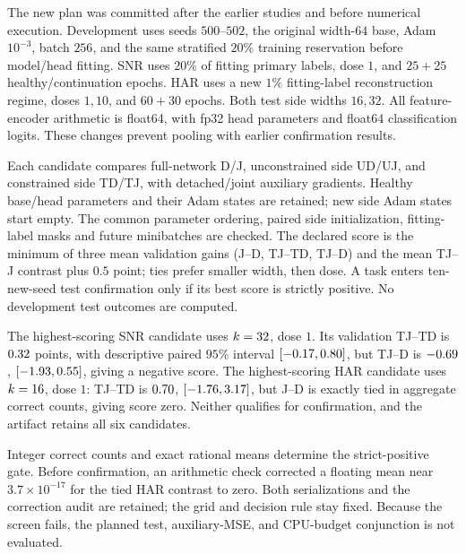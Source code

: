 \documentclass{article}
\begin{document}
The new plan was committed after the earlier studies and before numerical execution. Development uses seeds $500$--$502$, the original width-$64$ base, Adam $10^{-3}$, batch $256$, and the same stratified $20\%$ training reservation before model/head fitting. SNR uses $20\%$ of fitting primary labels, dose $1$, and $25+25$ healthy/continuation epochs. HAR uses a new $1\%$ fitting-label reconstruction regime, doses $1,10$, and $60+30$ epochs. Both test side widths $16,32$. All feature-encoder arithmetic is float64, with fp32 head parameters and float64 classification logits. These changes prevent pooling with earlier confirmation results.

Each candidate compares full-network D/J, unconstrained side UD/UJ, and constrained side TD/TJ, with detached/joint auxiliary gradients. Healthy base/head parameters and their Adam states are retained; new side Adam states start empty. The common parameter ordering, paired side initialization, fitting-label masks and future minibatches are checked. The declared score is the minimum of three mean validation gains (J--D, TJ--TD, TJ--D) and the mean TJ--J contrast plus $0.5$ point; ties prefer smaller width, then dose. A task enters ten-new-seed test confirmation only if its best score is strictly positive. No development test outcomes are computed.



The highest-scoring SNR candidate uses $k=32$, dose $1$. Its validation TJ--TD is $0.32$ points, with descriptive paired $95\%$ interval $[-0.17,0.80]$, but TJ--D is $-0.69$, $[-1.93,0.55]$, giving a negative score. The highest-scoring HAR candidate uses $k=16$, dose $1$: TJ--TD is $0.70$, $[-1.76,3.17]$, but J--D is exactly tied in aggregate correct counts, giving score zero. Neither qualifies for confirmation, and the artifact retains all six candidates.

Integer correct counts and exact rational means determine the strict-positive gate. Before confirmation, an arithmetic check corrected a floating mean near $3.7\times10^{-17}$ for the tied HAR contrast to zero. Both serializations and the correction audit are retained; the grid and decision rule stay fixed. Because the screen fails, the planned test, auxiliary-MSE, and CPU-budget conjunction is not evaluated.
\end{document}
